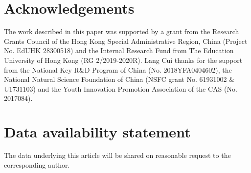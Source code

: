 \documentclass[useAMS,usenatbib]{mn2e}
\begin{document}
\section{Acknowledgements}
The work described in this paper was supported by a grant from the Research Grants Council of the Hong Kong Special Administrative Region, China (Project No. EdUHK 28300518) and the Internal Research Fund from The Education University of Hong Kong (RG 2/2019-2020R). Lang Cui thanks for the support from the National Key R\&D Program of China (No. 2018YFA0404602), the National Natural Science Foundation of China (NSFC grant No. 61931002 \& U1731103) and the Youth Innovation Promotion Association of the CAS (No. 2017084).

\section{Data availability statement}
The data underlying this article will be shared on reasonable request to the corresponding author.
\end{document}
